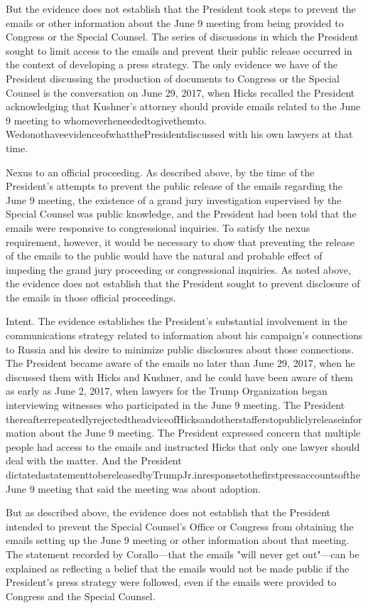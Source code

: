 But the evidence does not establish that the President took steps to prevent the emails or other information about the June 9 meeting from being provided to Congress or the Special Counsel.
The series of discussions in which the President sought to limit access to the emails and prevent their public release occurred in the context of developing a press strategy.
The only evidence we have of the President discussing the production of documents to Congress or the Special Counsel is the conversation on June 29, 2017, when Hicks recalled the President acknowledging that Kushner's attorney should provide emails related to the June 9 meeting to whomeverheneededtogivethemto.
WedonothaveevidenceofwhatthePresidentdiscussed with his own lawyers at that time.

Nexus to an official proceeding.
As described above, by the time of the President's attempts to prevent the public release of the emails regarding the June 9 meeting, the existence of a grand jury investigation supervised by the Special Counsel was public knowledge, and the President had been told that the emails were responsive to congressional inquiries.
To satisfy the nexus requirement, however, it would be necessary to show that preventing the release of the emails to the public would have the natural and probable effect of impeding the grand jury proceeding or congressional inquiries.
As noted above, the evidence does not establish that the President sought to prevent disclosure of the emails in those official proceedings.

Intent.
The evidence establishes the President's substantial involvement in the communications strategy related to information about his campaign's connections to Russia and his desire to minimize public disclosures about those connections.
The President became aware of the emails no later than June 29, 2017, when he discussed them with Hicks and Kushner, and he could have been aware of them as early as June 2, 2017, when lawyers for the Trump Organization began interviewing witnesses who participated in the June 9 meeting.
The President thereafterrepeatedlyrejectedtheadviceofHicksandotherstafferstopubliclyreleaseinformation about the June 9 meeting.
The President expressed concern that multiple people had access to the emails and instructed Hicks that only one lawyer should deal with the matter.
And the President dictatedastatementtobereleasedbyTrumpJr.inresponsetothefirstpressaccountsoftheJune 9 meeting that said the meeting was about adoption.

But as described above, the evidence does not establish that the President intended to prevent the Special Counsel's Office or Congress from obtaining the emails setting up the June 9 meeting or other information about that meeting.
The statement recorded by Corallo—that the emails "will never get out"—can be explained as reflecting a belief that the emails would not be made public if the President's press strategy were followed, even if the emails were provided to Congress and the Special Counsel.

